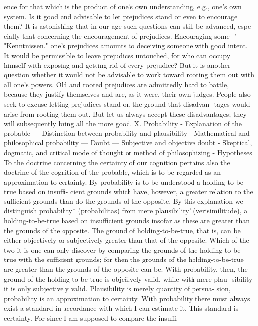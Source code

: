 ence for that which is the product of one's own understanding, e.g., one's
own system.
Is it good and advisable to let prejudices stand or even to encourage them? It
is astonishing that in our age such questions can still be advanced, espe-
cially that concerning the encouragement of prejudices. Encouraging some-
'
"Kenntnissen."
one's prejudices amounts to deceiving someone with good intent. It would
be permissible to leave prejudices untouched, for who can occupy himself
with exposing and getting rid of every prejudice? But it is another question
whether it would not be advisable to work toward rooting them out with all
one's powers. Old and rooted prejudices are admittedly hard to battle,
because they justify themselves and are, as it were, their own judges. People
also seek to excuse letting prejudices stand on the ground that disadvan-
tages would arise from rooting them out. But let us always accept these
disadvantages; they will subsequently bring all the more good.
X.
Probability - Explanation of the probable — Distinction between
probability and plausibility - Mathematical and philosophical
probability — Doubt — Subjective and objective doubt - Skeptical,
dogmatic, and critical mode of thought or method of philosophizing -
Hypotheses
To the doctrine concerning the certainty of our cognition pertains also the
doctrine of the cognition of the probable, which is to be regarded as an
approximation to certainty.
By probability is to be understood a holding-to-be-true based on insuffi-
cient grounds which have, however, a greater relation to the sufficient
grounds than do the grounds of the opposite. By this explanation we
distinguish probability* (probabilitas) from mere plausibility' (verisimilitude),
a holding-to-be-true based on insufficient grounds insofar as these are
greater than the grounds of the opposite.
The ground of holding-to-be-true, that is, can be either objectively or
subjectively greater than that of the opposite. Which of the two it is one can
only discover by comparing the grounds of the holding-to-be-true with
the sufficient grounds; for then the grounds of the holding-to-be-true are
greater than the grounds of the opposite can be. With probability, then, the
ground of the holding-to-be-true is objeäively valid, while with mere plau-
sibility it is only subjectively valid. Plausibility is merely quantity of persua-
sion, probability is an approximation to certainty. With probability there
must always exist a standard in accordance with which I can estimate it.
This standard is certainty. For since I am supposed to compare the insuffi-
